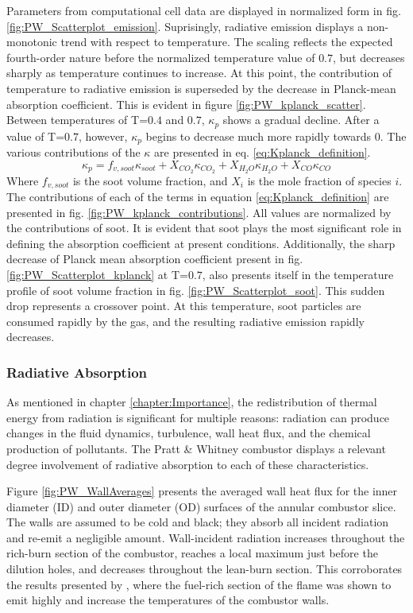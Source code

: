 Parameters from computational cell data are displayed in normalized form in fig. \ref{fig:PW_Scatterplot_emission}. 
Suprisingly, radiative emission displays a non-monotonic trend with respect to temperature. The scaling reflects the expected fourth-order nature before the normalized temperature value of $0.7$, but decreases sharply as temperature continues to increase.
At this point, the contribution of temperature to radiative emission is superseded by the decrease in Planck-mean absorption coefficient.
This is evident in figure \ref{fig:PW_kplanck_scatter}.
Between temperatures of T=$0.4$ and $0.7$, $\kappa{}_p$ shows a gradual decline. After a value of T=$0.7$, however, $\kappa{}_{p}$ begins to decrease much more rapidly towards $0$. 
The various contributions of the $\kappa{}$ are presented in eq. \ref{eq:Kplanck_definition}.
\begin{equation}
    \kappa{}_p=f_{v,soot}\kappa{}_{soot}+X_{CO_2}\kappa{}_{CO_2}+X_{H_2O}\kappa{}_{H_2O}+X_{CO}\kappa{}_{CO}
    \label{eq:Kplanck_definition}
\end{equation}
Where $f_{v,soot}$ is the soot volume fraction, and $X_i$ is the mole fraction of species $i$.
The contributions of each of the terms in equation \ref{eq:Kplanck_definition} are presented in fig. \ref{fig:PW_kplanck_contributions}. All values are normalized by the contributions of soot.
It is evident that soot plays the most significant role in defining the absorption coefficient at present conditions. Additionally, the sharp decrease of Planck mean absorption coefficient present in fig. \ref{fig:PW_Scatterplot_kplanck} at T=$0.7$, also presents itself in the temperature profile of soot volume fraction in fig. \ref{fig:PW_Scatterplot_soot}.
This sudden drop represents a crossover point. At this temperature, soot particles are consumed rapidly by the gas, and the resulting radiative emission rapidly decreases.

\subsubsection{Radiative Absorption}
As mentioned in chapter \ref{chapter:Importance}, the redistribution of thermal energy from radiation is significant for multiple reasons: radiation can produce changes in the fluid dynamics, turbulence, wall heat flux, and the chemical production of pollutants.
The Pratt \& Whitney combustor displays a relevant degree involvement of radiative absorption to each of these characteristics.

Figure \ref{fig:PW_WallAverages} presents the averaged wall heat flux for the inner diameter (ID) and outer diameter (OD) surfaces of the annular combustor slice. 
The walls are assumed to be cold and black; they absorb all incident radiation and re-emit a negligible amount. 
Wall-incident radiation increases throughout the rich-burn section of the combustor, reaches a local maximum just before the dilution holes, and decreases throughout the lean-burn section.
This corroborates the results presented by \citet{Gamil2020AssessmentChamber}, where the fuel-rich section of the flame was shown to emit highly and increase the temperatures of the combustor walls.


